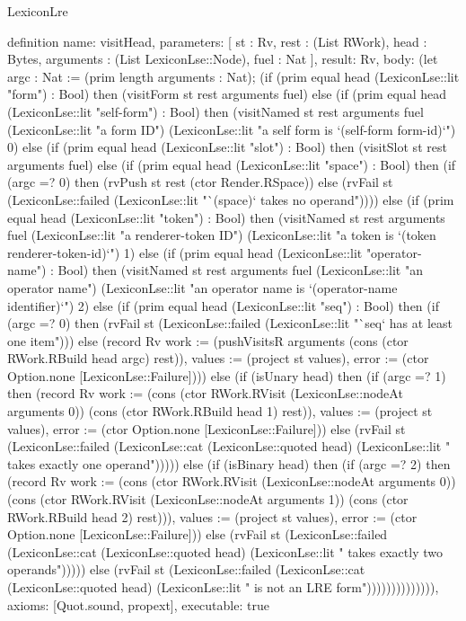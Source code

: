 \begin{lexlean}{LexiconLre}
\begin{semanticmodule}
definition{
  name: visitHead,
  parameters: [
    st : Rv,
    rest : (List RWork),
    head : Bytes,
    arguments : (List LexiconLse::Node),
    fuel : Nat
  ],
  result: Rv,
  body: (let argc : Nat := (prim length arguments : Nat); (if (prim equal head (LexiconLse::lit "form") : Bool) then (visitForm st rest arguments fuel) else (if (prim equal head (LexiconLse::lit "self-form") : Bool) then (visitNamed st rest arguments fuel (LexiconLse::lit "a form ID") (LexiconLse::lit "a self form is `(self-form form-id)`") 0) else (if (prim equal head (LexiconLse::lit "slot") : Bool) then (visitSlot st rest arguments fuel) else (if (prim equal head (LexiconLse::lit "space") : Bool) then (if (argc =? 0) then (rvPush st rest (ctor Render.RSpace)) else (rvFail st (LexiconLse::failed (LexiconLse::lit "`(space)` takes no operand")))) else (if (prim equal head (LexiconLse::lit "token") : Bool) then (visitNamed st rest arguments fuel (LexiconLse::lit "a renderer-token ID") (LexiconLse::lit "a token is `(token renderer-token-id)`") 1) else (if (prim equal head (LexiconLse::lit "operator-name") : Bool) then (visitNamed st rest arguments fuel (LexiconLse::lit "an operator name") (LexiconLse::lit "an operator name is `(operator-name identifier)`") 2) else (if (prim equal head (LexiconLse::lit "seq") : Bool) then (if (argc =? 0) then (rvFail st (LexiconLse::failed (LexiconLse::lit "`seq` has at least one item"))) else (record Rv {work := (pushVisitsR arguments (cons (ctor RWork.RBuild head argc) rest)), values := (project st values), error := (ctor Option.none [LexiconLse::Failure])})) else (if (isUnary head) then (if (argc =? 1) then (record Rv {work := (cons (ctor RWork.RVisit (LexiconLse::nodeAt arguments 0)) (cons (ctor RWork.RBuild head 1) rest)), values := (project st values), error := (ctor Option.none [LexiconLse::Failure])}) else (rvFail st (LexiconLse::failed (LexiconLse::cat (LexiconLse::quoted head) (LexiconLse::lit " takes exactly one operand"))))) else (if (isBinary head) then (if (argc =? 2) then (record Rv {work := (cons (ctor RWork.RVisit (LexiconLse::nodeAt arguments 0)) (cons (ctor RWork.RVisit (LexiconLse::nodeAt arguments 1)) (cons (ctor RWork.RBuild head 2) rest))), values := (project st values), error := (ctor Option.none [LexiconLse::Failure])}) else (rvFail st (LexiconLse::failed (LexiconLse::cat (LexiconLse::quoted head) (LexiconLse::lit " takes exactly two operands"))))) else (rvFail st (LexiconLse::failed (LexiconLse::cat (LexiconLse::quoted head) (LexiconLse::lit " is not an LRE form")))))))))))))),
  axioms: [Quot.sound, propext],
  executable: true
}


\end{semanticmodule}
\end{lexlean}
